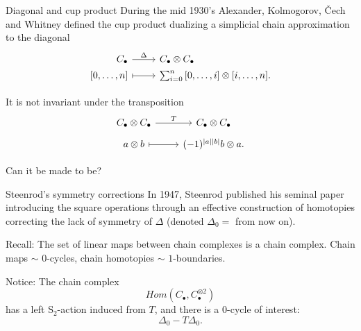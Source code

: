 \documentclass[10pt,t, handout]{beamer} %
\renewcommand{\S}{\mathrm{S}}
\begin{document}
\begin{frame}[fragile]{Diagonal and cup product}
	During the mid 1930's Alexander, Kolmogorov, \v{C}ech and Whitney defined the cup product dualizing a simplicial chain approximation to the diagonal
	\begin{equation*}
	\begin{tikzcd}[%
	,row sep = 0ex
	,/tikz/column 1/.append style={anchor=base east}
	,/tikz/column 2/.append style={anchor=base west}
	]
	C_\bullet \arrow[r, "\Delta"] & C_\bullet \otimes C_\bullet \\
	{[0, \dots, n]} \arrow[r, |->] & \sum_{i=0}^{n} {[0, \dots, i] \otimes [i, \dots, n]}.
	\end{tikzcd}
	\end{equation*}

	\pause \vspace*{10pt}

	It is not invariant under the transposition
	\begin{equation*}
	\begin{tikzcd}[row sep = tiny]
	C_\bullet \otimes C_\bullet \arrow[r, "T"] & C_\bullet \otimes C_\bullet \\
	a \otimes b \arrow[r, |->]& (-1)^{|a||b|} b \otimes a.
	\end{tikzcd}
	\end{equation*}
	
	\vspace*{10pt}\pause
	
	\textcolor{pblue}{Can it be made to be?}
\end{frame}


\begin{frame}{Steenrod's symmetry corrections}
	In 1947, Steenrod published his seminal paper introducing the square operations through an effective construction of homotopies correcting the lack of symmetry of $\Delta$ (denoted $\Delta_0 = $ from now on).

	\vspace*{15pt} \pause

	\textcolor{pblue}{Recall:} The set of linear maps between chain complexes is a chain complex.
	Chain maps $\sim$ $0$-cycles, chain homotopies $\sim$ $1$-boundaries.

	\vspace*{15pt}\pause

	\textcolor{pblue}{Notice:} The chain complex
	\begin{equation*} \label{eq: complex of maps to the tensor product}
	Hom\left(C_\bullet, C_\bullet^{\otimes 2}  \right)
	\end{equation*}
	has a left $\S_2$-action induced from $T$, and there is a $0$-cycle of interest:
	\begin{equation*}
	\Delta_0 - T \Delta_0.
	\end{equation*}
\end{frame}
\end{document}
